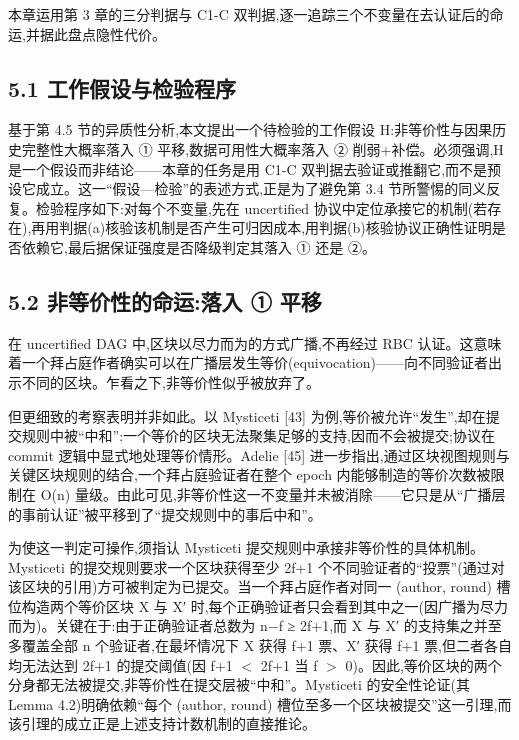 \documentclass[UTF8,fontset=windows,a4paper,11pt]{ctexart}
\begin{document}
本章运用第 3 章的三分判据与 C1-C
双判据,逐一追踪三个不变量在去认证后的命运,并据此盘点隐性代价。

\subsection{5.1
工作假设与检验程序}\label{ux5de5ux4f5cux5047ux8bbeux4e0eux68c0ux9a8cux7a0bux5e8f}

基于第 4.5 节的异质性分析,本文提出一个待检验的工作假设
H:非等价性与因果历史完整性大概率落入 ① 平移,数据可用性大概率落入 ②
削弱+补偿。必须强调,H 是一个假设而非结论------本章的任务是用 C1-C
双判据去验证或推翻它,而不是预设它成立。这一``假设---检验''的表述方式,正是为了避免第
3.4 节所警惕的同义反复。检验程序如下:对每个不变量,先在 uncertified
协议中定位承接它的机制(若存在),再用判据(a)核验该机制是否产生可归因成本,用判据(b)核验协议正确性证明是否依赖它,最后据保证强度是否降级判定其落入
① 还是 ②。

\subsection{5.2 非等价性的命运:落入 ①
平移}\label{ux975eux7b49ux4ef7ux6027ux7684ux547dux8fd0ux843dux5165-ux2460-ux5e73ux79fb}

在 uncertified DAG 中,区块以尽力而为的方式广播,不再经过 RBC
认证。这意味着一个拜占庭作者确实可以在广播层发生等价(equivocation)------向不同验证者出示不同的区块。乍看之下,非等价性似乎被放弃了。

但更细致的考察表明并非如此。以 Mysticeti {[}43{]}
为例,等价被允许``发生'',却在提交规则中被``中和'':一个等价的区块无法聚集足够的支持,因而不会被提交;协议在
commit 逻辑中显式地处理等价情形。Adelie {[}45{]}
进一步指出,通过区块视图规则与关键区块规则的结合,一个拜占庭验证者在整个
epoch 内能够制造的等价次数被限制在 O(n)
量级。由此可见,非等价性这一不变量并未被消除------它只是从``广播层的事前认证''被平移到了``提交规则中的事后中和''。

为使这一判定可操作,须指认 Mysticeti 提交规则中承接非等价性的具体机制。Mysticeti 的提交规则要求一个区块获得至少 2f+1 个不同验证者的``投票''(通过对该区块的引用)方可被判定为已提交。当一个拜占庭作者对同一 (author, round) 槽位构造两个等价区块 X 与 X′ 时,每个正确验证者只会看到其中之一(因广播为尽力而为)。关键在于:由于正确验证者总数为 n−f ≥ 2f+1,而 X 与 X′ 的支持集之并至多覆盖全部 n 个验证者,在最坏情况下 X 获得 f+1 票、X′ 获得 f+1 票,但二者各自均无法达到 2f+1 的提交阈值(因 f+1 $<$ 2f+1 当 f $>$ 0)。因此,等价区块的两个分身都无法被提交,非等价性在提交层被``中和''。Mysticeti 的安全性论证(其 Lemma 4.2)明确依赖``每个 (author, round) 槽位至多一个区块被提交''这一引理,而该引理的成立正是上述支持计数机制的直接推论。
\end{document}
